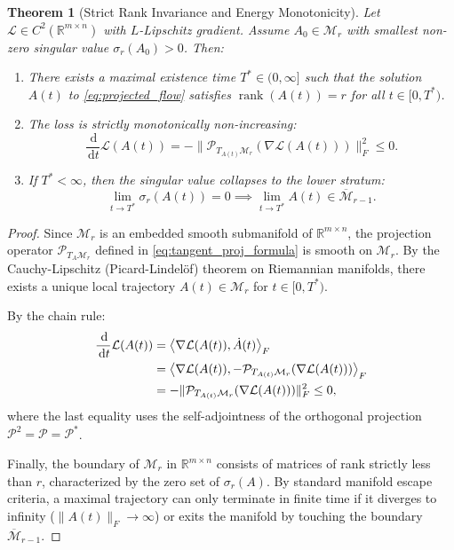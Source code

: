 \documentclass[11pt,a4paper,reqno]{amsart}
\newtheorem{theorem}{Theorem}[section]
\theoremstyle{definition}
\numberwithin{equation}{section}
\newcommand{\R}{\mathbb{R}}
\newcommand{\rank}{\operatorname{rank}}
\newcommand{\inner}[2]{\left\langle #1, #2 \right\rangle}
\newcommand{\dif}{\,\mathrm{d}}
\begin{document}
\begin{theorem}[Strict Rank Invariance and Energy Monotonicity]
\label{thm:rank_preservation}
Let $\mathcal{L} \in C^2(\R^{m \times n})$ with $L$-Lipschitz gradient. Assume $A_0 \in \mathcal{M}_r$ with smallest non-zero singular value $\sigma_r(A_0) > 0$. Then:
\begin{enumerate}[label=(\roman*)]
    \item There exists a maximal existence time $T^* \in (0, \infty]$ such that the solution $A(t)$ to \eqref{eq:projected_flow} satisfies $\rank(A(t)) = r$ for all $t \in [0, T^*)$.
    \item The loss is strictly monotonically non-increasing:
    \begin{equation}
        \frac{\dif}{\dif t} \mathcal{L}(A(t)) = -\|\mathcal{P}_{T_{A(t)} \mathcal{M}_r}(\nabla \mathcal{L}(A(t)))\|_F^2 \le 0.
    \end{equation}
    \item If $T^* < \infty$, then the singular value collapses to the lower stratum:
    \begin{equation}
        \lim_{t \to T^*} \sigma_r(A(t)) = 0 \implies \lim_{t \to T^*} A(t) \in \overline{\mathcal{M}}_{r-1}.
    \end{equation}
\end{enumerate}
\end{theorem}
\begin{proof}
Since $\mathcal{M}_r$ is an embedded smooth submanifold of $\R^{m \times n}$, the projection operator $\mathcal{P}_{T_A \mathcal{M}_r}$ defined in \eqref{eq:tangent_proj_formula} is smooth on $\mathcal{M}_r$. By the Cauchy-Lipschitz (Picard-Lindel\"of) theorem on Riemannian manifolds, there exists a unique local trajectory $A(t) \in \mathcal{M}_r$ for $t \in [0, T^*)$.

By the chain rule:
\begin{align}
    \frac{\dif}{\dif t} \mathcal{L}(A(t)) &= \inner{\nabla \mathcal{L}(A(t))}{\dot{A}(t)}_F \notag \\
    &= \inner{\nabla \mathcal{L}(A(t))}{-\mathcal{P}_{T_{A(t)} \mathcal{M}_r}(\nabla \mathcal{L}(A(t)))}_F \notag \\
    &= -\|\mathcal{P}_{T_{A(t)} \mathcal{M}_r}(\nabla \mathcal{L}(A(t)))\|_F^2 \le 0,
\end{align}
where the last equality uses the self-adjointness of the orthogonal projection $\mathcal{P}^2 = \mathcal{P} = \mathcal{P}^*$.

Finally, the boundary of $\mathcal{M}_r$ in $\R^{m \times n}$ consists of matrices of rank strictly less than $r$, characterized by the zero set of $\sigma_r(A)$. By standard manifold escape criteria, a maximal trajectory can only terminate in finite time if it diverges to infinity ($\|A(t)\|_F \to \infty$) or exits the manifold by touching the boundary $\overline{\mathcal{M}}_{r-1}$.
\end{proof}
\end{document}
